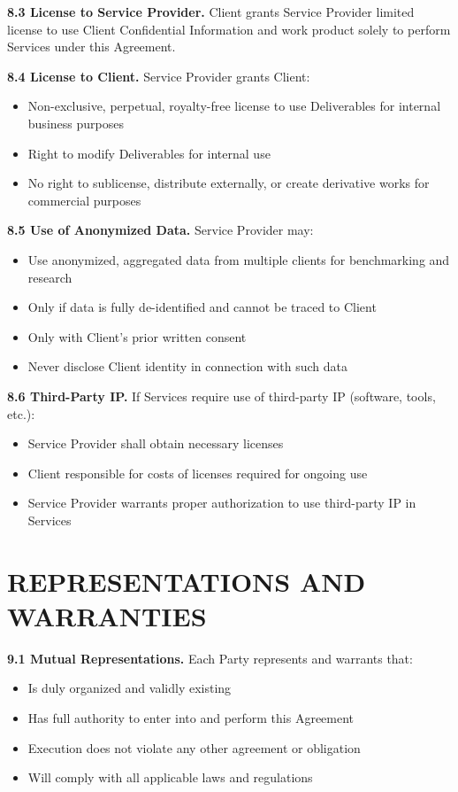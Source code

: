 \documentclass[11pt,a4paper]{article}
\begin{document}
\textbf{8.3 License to Service Provider.} Client grants Service Provider limited license to use Client Confidential Information and work product solely to perform Services under this Agreement.

\textbf{8.4 License to Client.} Service Provider grants Client:
\begin{itemize}
\item Non-exclusive, perpetual, royalty-free license to use Deliverables for internal business purposes
\item Right to modify Deliverables for internal use
\item No right to sublicense, distribute externally, or create derivative works for commercial purposes
\end{itemize}

\textbf{8.5 Use of Anonymized Data.} Service Provider may:
\begin{itemize}
\item Use anonymized, aggregated data from multiple clients for benchmarking and research
\item Only if data is fully de-identified and cannot be traced to Client
\item Only with Client's prior written consent
\item Never disclose Client identity in connection with such data
\end{itemize}

\textbf{8.6 Third-Party IP.} If Services require use of third-party IP (software, tools, etc.):
\begin{itemize}
\item Service Provider shall obtain necessary licenses
\item Client responsible for costs of licenses required for ongoing use
\item Service Provider warrants proper authorization to use third-party IP in Services
\end{itemize}

\section{REPRESENTATIONS AND WARRANTIES}

\textbf{9.1 Mutual Representations.} Each Party represents and warrants that:
\begin{itemize}
\item Is duly organized and validly existing
\item Has full authority to enter into and perform this Agreement
\item Execution does not violate any other agreement or obligation
\item Will comply with all applicable laws and regulations
\end{itemize}
\end{document}
